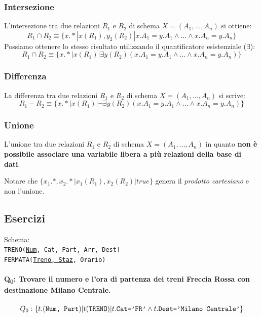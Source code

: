 \documentclass{report}
\begin{document}
\subsubsection{Intersezione}
L'intersezione tra due relazioni $R_1$ e $R_2$ di schema $X=(A_1, \dots, A_n)$ si ottiene:
\[ R_1 \cap R_2 \equiv \{ x.* | x(R_1), y_2(R_2) | x.A_1 = y.A_1 \wedge \dots \wedge x.A_n = y.A_n \} \]
Possiamo ottenere lo stesso risultato utilizzando il quantificatore esistenziale ($\exists$):
\[ R_1 \cap R_2 \equiv \{ x.* | x(R_1)| \exists y(R_2)(x.A_1 = y.A_1 \wedge \dots \wedge x.A_n = y.A_n) \} \]

\subsubsection{Differenza}

La differenza tra due relazioni $R_1$ e $R_2$ di schema $X=(A_1, \dots, A_n)$ si scrive:
\[ R_1 - R_2 \equiv \{x.* | x(R_1) | \neg \exists y(R_2) (x.A_1=y.A_1 \wedge \dots \wedge x.A_n = y.A_n) \} \]

\subsubsection{Unione}

L'unione tra due relazioni $R_1$ e $R_2$ di schema $X=(A_1, \dots, A_n)$ \textbf{\color{red}{non \`e esprimibile}} in quanto \textbf{non \`e possibile associare una variabile libera a pi\`u relazioni della base di dati}.

Notare che $\{ x_1.*, x_2.* | x_1(R_1), x_2(R_2) | true \}$ genera il \emph{prodotto cartesiano} e non l'unione.

\subsection{Esercizi}

Schema:\\
\texttt{TRENO(\underline{Num}, Cat, Part, Arr, Dest)\\
FERMATA(\underline{Treno, Staz}, Orario)}

\paragraph{Q\textsubscript{0}: Trovare il numero e l'ora di partenza dei treni Freccia Rossa con destinazione Milano Centrale.}

\[ Q_0: \{t.(\text{\texttt{Num, Part}}) |t(\text{\texttt{TRENO}}) | t.\text{\texttt{Cat='FR'}} \wedge t.\text{\texttt{Dest='Milano Centrale'}} \} \]
\end{document}
